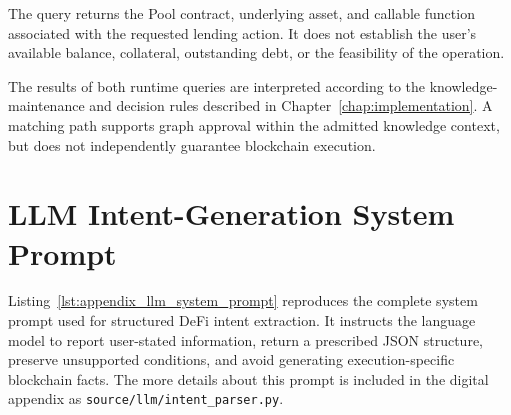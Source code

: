 The query returns the Pool contract, underlying asset,
and callable function associated with the requested
lending action. It does not establish the user's
available balance, collateral, outstanding debt, or
the feasibility of the operation.

The results of both runtime queries are interpreted
according to the knowledge-maintenance and decision
rules described in Chapter~\ref{chap:implementation}.
A matching path supports graph approval within the
admitted knowledge context, but does not independently
guarantee blockchain execution.


\section{LLM Intent-Generation System Prompt}
\label{app:llm_system_prompt}

Listing~\ref{lst:appendix_llm_system_prompt} reproduces the complete
system prompt used for structured DeFi intent extraction. It instructs the
language model to report user-stated information, return a prescribed JSON
structure, preserve unsupported conditions, and avoid generating
execution-specific blockchain facts. The more details about this prompt is included in
the digital appendix as \texttt{source/llm/intent\_parser.py}.

